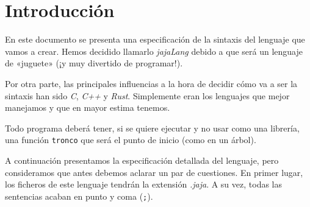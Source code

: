 \section{Introducción}
En este documento se presenta una especificación de la sintaxis del lenguaje que
vamos a crear. Hemos decidido llamarlo \textit{jajaLang} debido a que será un
lenguaje de «juguete» (¡y muy divertido de programar!).

Por otra parte, las principales influencias a la hora de decidir cómo va a ser
la sintaxis han sido \textit{C}, \textit{C++} y \textit{Rust}. Simplemente eran
los lenguajes que mejor manejamos y que en mayor estima tenemos.

Todo programa deberá tener, si se quiere ejecutar y no usar como una
librería, una función \lstinline{tronco} que será el punto de inicio (como en un
árbol).

A continuación presentamos la especificación detallada del lenguaje, pero
consideramos que antes debemos aclarar un par de cuestiones. En primer lugar,
los ficheros de este lenguaje tendrán la extensión \textit{.jaja}. A su vez,
todas las sentencias acaban en punto y coma (\lstinline{;}).
